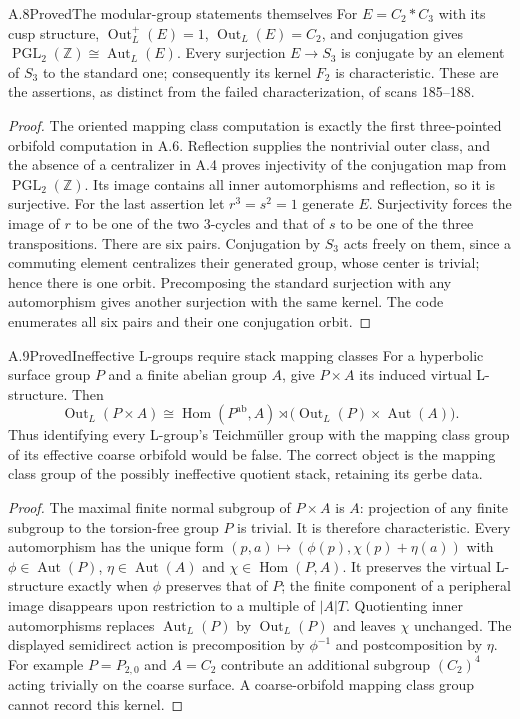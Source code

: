 \begin{statement}{A.8}{Proved}{The modular-group statements themselves}
For $E=C_2*C_3$ with its cusp structure,
$\operatorname{Out}_L^+(E)=1$,
$\operatorname{Out}_L(E)=C_2$, and conjugation gives
$\operatorname{PGL}_2(\mathbb Z)\cong\operatorname{Aut}_L(E)$.
Every surjection $E\to S_3$ is conjugate by an element of $S_3$
to the standard one; consequently its kernel $F_2$ is
characteristic. These are the assertions, as distinct from the
failed characterization, of scans 185--188.
\end{statement}
\begin{proof}
The oriented mapping class computation is exactly the first
three-pointed orbifold computation in A.6. Reflection supplies
the nontrivial outer class, and the absence of a centralizer in
A.4 proves injectivity of the conjugation map from
$\operatorname{PGL}_2(\mathbb Z)$. Its image contains all inner
automorphisms and reflection, so it is surjective.
For the last assertion let $r^3=s^2=1$ generate $E$.
Surjectivity forces the image of $r$ to be one of the two
3-cycles and that of $s$ to be one of the three transpositions.
There are six pairs. Conjugation by $S_3$ acts freely on them,
since a commuting element centralizes their generated group,
whose center is trivial; hence there is one orbit. Precomposing
the standard surjection with any automorphism gives another
surjection with the same kernel. The code enumerates all six
pairs and their one conjugation orbit.
\end{proof}

\begin{statement}{A.9}{Proved}{Ineffective L-groups require stack mapping classes}
For a hyperbolic surface group $P$ and a finite abelian group $A$,
give $P\times A$ its induced virtual L-structure. Then
\[
 \operatorname{Out}_L(P\times A)
 \cong\operatorname{Hom}(P^{\mathrm{ab}},A)
 \rtimes\bigl(\operatorname{Out}_L(P)\times\operatorname{Aut}(A)\bigr).
\]
Thus identifying every L-group's Teichm\"uller group with the
mapping class group of its effective coarse orbifold would be
false. The correct object is the mapping class group of the
possibly ineffective quotient stack, retaining its gerbe data.
\end{statement}
\begin{proof}
The maximal finite normal subgroup of $P\times A$ is $A$:
projection of any finite subgroup to the torsion-free group $P$
is trivial. It is therefore characteristic. Every automorphism
has the unique form
$(p,a)\mapsto(\phi(p),\chi(p)+\eta(a))$ with
$\phi\in\operatorname{Aut}(P)$,
$\eta\in\operatorname{Aut}(A)$ and
$\chi\in\operatorname{Hom}(P,A)$. It preserves the virtual
L-structure exactly when $\phi$ preserves that of $P$;
the finite component of a peripheral image disappears upon
restriction to a multiple of $|A|T$. Quotienting inner
automorphisms replaces $\operatorname{Aut}_L(P)$ by
$\operatorname{Out}_L(P)$ and leaves $\chi$ unchanged.
The displayed semidirect action is precomposition by $\phi^{-1}$
and postcomposition by $\eta$. For example $P=P_{2,0}$ and
$A=C_2$ contribute an additional subgroup $(C_2)^4$ acting
trivially on the coarse surface. A coarse-orbifold mapping class
group cannot record this kernel.
\end{proof}

